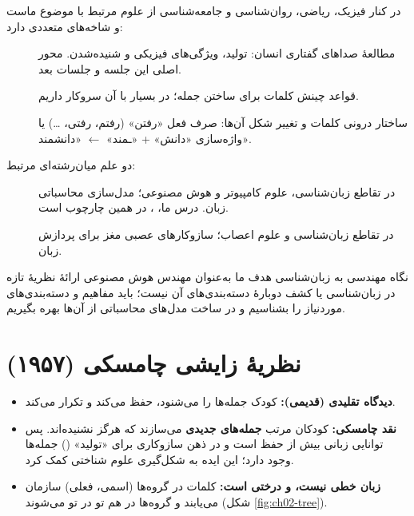  در کنار فیزیک، ریاضی، روان‌شناسی و جامعه‌شناسی از علوم مرتبط با موضوع ماست و شاخه‌های متعددی دارد:
\begin{description}
  \item[] مطالعهٔ صداهای گفتاری انسان: تولید، ویژگی‌های فیزیکی و شنیده‌شدن. محور اصلی این جلسه و جلسات بعد.
  \item[] قواعد چینش کلمات برای ساختن جمله؛ در  بسیار با آن سروکار داریم.
  \item[] ساختار درونی کلمات و تغییر شکل آن‌ها: صرف فعل «رفتن» (رفتم، رفتی، \ldots) یا واژه‌سازی «دانش» + «ـمند» $\leftarrow$ «دانشمند».
\end{description}
\noindent دو علم میان‌رشته‌ای مرتبط:
\begin{description}
  \item[] در تقاطع زبان‌شناسی، علوم کامپیوتر و هوش مصنوعی؛ مدل‌سازی محاسباتی زبان. درس ما، ، در همین چارچوب است.
  \item[] در تقاطع زبان‌شناسی و علوم اعصاب؛ سازوکارهای عصبی مغز برای پردازش زبان.
\end{description}

\begin{exambox}{نگاه مهندسی به زبان‌شناسی}
هدف ما به‌عنوان مهندس هوش مصنوعی ارائهٔ نظریهٔ تازه در زبان‌شناسی یا کشف دوبارهٔ دسته‌بندی‌های آن نیست؛ باید مفاهیم و دسته‌بندی‌های موردنیاز را بشناسیم و در ساخت مدل‌های محاسباتی از آن‌ها بهره بگیریم.
\end{exambox}

\section{نظریهٔ زایشی چامسکی (۱۹۵۷)}

\begin{itemize}
  \item \textbf{دیدگاه تقلیدی (قدیمی):} کودک جمله‌ها را می‌شنود، حفظ می‌کند و تکرار می‌کند.
  \item \textbf{نقد چامسکی:} کودکان مرتب \textbf{جمله‌های جدیدی} می‌سازند که هرگز نشنیده‌اند. پس توانایی زبانی بیش از حفظ است و در ذهن سازوکاری برای «تولید» () جمله‌ها وجود دارد؛ این ایده به شکل‌گیری علوم شناختی کمک کرد.
  \item \textbf{زبان خطی نیست،  و درختی است:} کلمات در گروه‌ها (اسمی، فعلی) سازمان می‌یابند و گروه‌ها در هم تو در تو می‌شوند (شکل \ref{fig:ch02-tree}).
\end{itemize}

